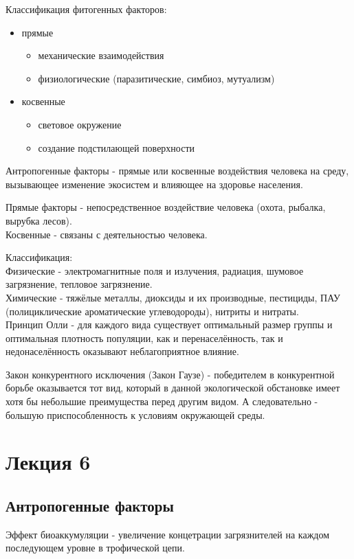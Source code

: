 Классификация фитогенных факторов:
\begin{itemize}
\item прямые
\begin{itemize}
\item механические взаимодействия
\item физиологические (паразитические, симбиоз, мутуализм)
\end{itemize}
\item косвенные
\begin{itemize}
\item световое окружение
\item создание подстилающей поверхности
\end{itemize}
\end{itemize}

Антропогенные факторы - прямые или косвенные воздействия человека на среду, вызывающее изменение экосистем и влияющее на здоровье населения.

Прямые факторы - непосредственное воздействие человека (охота, рыбалка, вырубка лесов).\\
Косвенные - связаны с деятельностью человека.

Классификация:\\
Физические - электромагнитные поля и излучения, радиация, шумовое загрязнение, тепловое загрязнение.\\
Химические - тяжёлые металлы, диоксиды и их производные, пестициды, ПАУ (полициклические ароматические углеводороды), нитриты и нитраты.\\


Принцип Олли - для каждого вида существует оптимальный размер группы и оптимальная плотность популяции, как и перенаселённость, так и недонаселённость оказывают неблагоприятное влияние.

Закон конкурентного исключения (Закон Гаузе) - победителем в конкурентной борьбе оказывается тот вид, который в данной экологической обстановке имеет хотя бы небольшие преимущества перед другим видом. А следовательно - большую приспособленность к условиям окружающей среды.

\chapter{Лекция 6}
\section{Антропогенные факторы}
Эффект биоаккумуляции - увеличение концетрации загрязнителей на каждом последующем уровне в трофической цепи.

